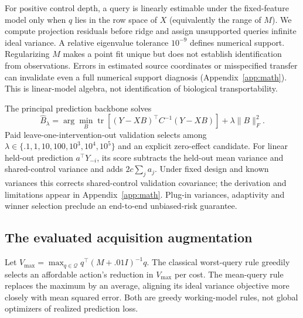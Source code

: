 For positive control depth, a query is linearly estimable under the fixed-feature model only when $q$ lies in the row space of $X$ (equivalently the range of $M$). We compute projection residuals before ridge and assign unsupported queries infinite ideal variance. A relative eigenvalue tolerance $10^{-9}$ defines numerical support. Regularizing $M$ makes a point fit unique but does not establish identification from observations. Errors in estimated source coordinates or misspecified transfer can invalidate even a full numerical support diagnosis (Appendix~\ref{app:math}). This is linear-model algebra, not identification of biological transportability.

The principal prediction backbone solves
\begin{equation}
 \widehat B_\lambda=\arg\min_B\operatorname{tr}[(Y-XB)^\top C^{-1}(Y-XB)]+\lambda\|B\|_F^2.
\end{equation}
Paid leave-one-intervention-out validation selects among $\lambda\in\{.1,1,10,100,10^3,10^4,10^5\}$ and an explicit zero-effect candidate. For linear held-out prediction $a^\top Y_{-i}$, its score subtracts the held-out mean variance and shared-control variance and adds $2c\sum_j a_j$. Under fixed design and known variances this corrects shared-control validation covariance; the derivation and limitations appear in Appendix~\ref{app:math}. Plug-in variances, adaptivity and winner selection preclude an end-to-end unbiased-risk guarantee.

\subsection{The evaluated acquisition augmentation}
Let $V_{\max}=\max_{q\in\mathcal Q}q^\top(M+.01I)^{-1}q$. The classical worst-query rule greedily selects an affordable action's reduction in $V_{\max}$ per cost. The mean-query rule replaces the maximum by an average, aligning its ideal variance objective more closely with mean squared error. Both are greedy working-model rules, not global optimizers of realized prediction loss.

